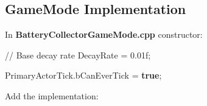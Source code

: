 \documentclass[
  letterpaper,
  DIV=11,
  numbers=noendperiod]{scrartcl}
\newenvironment{Shaded}{\begin{snugshade}}{\end{snugshade}}
\newcommand{\BuiltInTok}[1]{\textcolor[rgb]{0.00,0.23,0.31}{#1}}
\newcommand{\CommentTok}[1]{\textcolor[rgb]{0.37,0.37,0.37}{#1}}
\newcommand{\FloatTok}[1]{\textcolor[rgb]{0.68,0.00,0.00}{#1}}
\newcommand{\KeywordTok}[1]{\textcolor[rgb]{0.00,0.23,0.31}{\textbf{#1}}}
\newcommand{\NormalTok}[1]{\textcolor[rgb]{0.00,0.23,0.31}{#1}}
\newcommand{\OperatorTok}[1]{\textcolor[rgb]{0.37,0.37,0.37}{#1}}
\begin{document}
\subsection{GameMode Implementation}\label{gamemode-implementation}

In \textbf{BatteryCollectorGameMode.cpp} constructor:

\begin{Shaded}
\begin{Highlighting}[]
\CommentTok{// Base decay rate}
\NormalTok{DecayRate }\OperatorTok{=} \FloatTok{0.01}\BuiltInTok{f}\OperatorTok{;}

\NormalTok{PrimaryActorTick}\OperatorTok{.}\NormalTok{bCanEverTick }\OperatorTok{=} \KeywordTok{true}\OperatorTok{;}
\end{Highlighting}
\end{Shaded}

Add the implementation:
\end{document}
